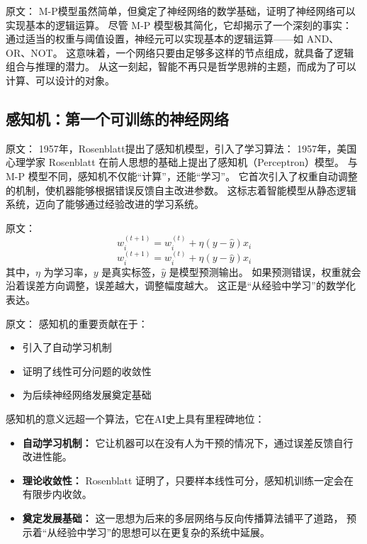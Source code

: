 原文：
M-P模型虽然简单，但奠定了神经网络的数学基础，证明了神经网络可以实现基本的逻辑运算。
尽管 M-P 模型极其简化，它却揭示了一个深刻的事实：  
通过适当的权重与阈值设置，神经元可以实现基本的逻辑运算——如 AND、OR、NOT。  
这意味着，一个网络只要由足够多这样的节点组成，就具备了逻辑组合与推理的潜力。  
从这一刻起，智能不再只是哲学思辨的主题，而成为了可以计算、可以设计的对象。


\subsection{感知机：第一个可训练的神经网络}

原文：
1957年，Rosenblatt提出了感知机模型，引入了学习算法：
1957年，美国心理学家 Rosenblatt 在前人思想的基础上提出了感知机（Perceptron）模型。  
与 M-P 模型不同，感知机不仅能“计算”，还能“学习”。  
它首次引入了权重自动调整的机制，使机器能够根据错误反馈自主改进参数。  
这标志着智能模型从静态逻辑系统，迈向了能够通过经验改进的学习系统。

原文：
\begin{equation}
w_{i}^{(t+1)} = w_{i}^{(t)} + \eta (y - \hat{y}) x_i
\end{equation}
\begin{equation}
w_{i}^{(t+1)} = w_{i}^{(t)} + \eta (y - \hat{y}) x_i
\end{equation}
其中，$\eta$ 为学习率，$y$ 是真实标签，$\hat{y}$ 是模型预测输出。  
如果预测错误，权重就会沿着误差方向调整，误差越大，调整幅度越大。  
这正是“从经验中学习”的数学化表达。

原文：
感知机的重要贡献在于：
\begin{itemize}
\item 引入了自动学习机制
\item 证明了线性可分问题的收敛性
\item 为后续神经网络发展奠定基础
\end{itemize}
感知机的意义远超一个算法，它在AI史上具有里程碑地位：
\begin{itemize}
\item {\bf 自动学习机制：} 它让机器可以在没有人为干预的情况下，通过误差反馈自行改进性能。
\item {\bf 理论收敛性：} Rosenblatt 证明了，只要样本线性可分，感知机训练一定会在有限步内收敛。
\item {\bf 奠定发展基础：} 这一思想为后来的多层网络与反向传播算法铺平了道路，  
预示着“从经验中学习”的思想可以在更复杂的系统中延展。
\end{itemize}


